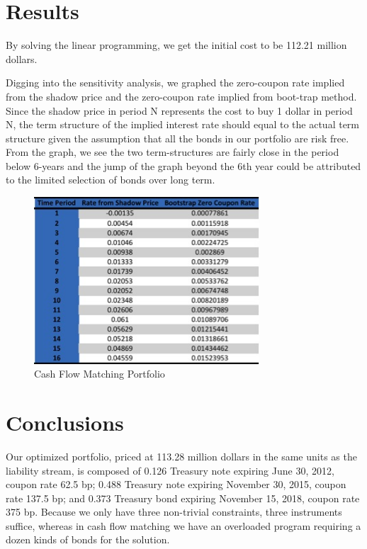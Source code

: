 \documentclass[oneside,12pt]{report}
\begin{document}
\chapter{Results}\label{}

By solving the linear programming, we get the initial cost to be 112.21 million dollars.

\noindent Digging into the sensitivity analysis, we graphed the zero-coupon rate implied from the shadow price and the zero-coupon rate implied from boot-trap method. Since the shadow price in period N represents the cost to buy 1 dollar in period N, the term structure of the implied interest rate should equal to the actual term structure given the assumption that all the bonds in our portfolio are risk free. From the graph, we see the two term-structures are fairly close in the period below 6-years and the jump of the graph beyond the 6th year could be attributed to the limited selection of bonds over long term.

\begin{figure}[htb]
  \begin{center}
      \includegraphics[width=0.75\textwidth]
{cf.jpg}
    \end{center}
    \caption{Cash Flow Matching Portfolio}
\end{figure}

\chapter{Conclusions}\label{}
		        
Our optimized portfolio, priced at 113.28 million dollars in the same units as the liability stream, is composed of 0.126 Treasury note expiring June 30, 2012, coupon rate 62.5 bp; 0.488 Treasury note expiring November 30, 2015, coupon rate 137.5 bp; and 0.373 Treasury bond expiring November 15, 2018, coupon rate 375 bp. Because we only have three non-trivial constraints, three instruments suffice, whereas in cash flow matching we have an overloaded program requiring a dozen kinds of bonds for the solution.
\end{document}

